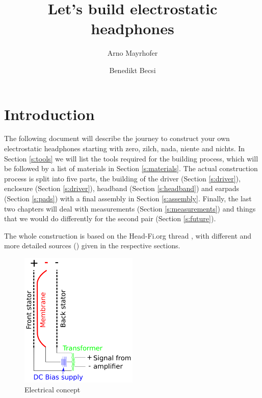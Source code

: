 \documentclass{article}
\begin{document}
\title{Let's build electrostatic headphones}
\author{Arno Mayrhofer \and Benedikt Becsi}
\maketitle

\tableofcontents

\newpage

\section{Introduction}
\label{s:intro}
The following document will describe the journey to construct your own electrostatic headphones starting with zero, zilch, nada, niente and nichts. In Section \ref{s:tools} we will list the tools required for the building process, which will be followed by a list of materials in Section \ref{s:materials}. The actual construction process is split into five parts, the building of the driver (Section \ref{s:driver}), enclosure (Section \ref{s:driver}), headband (Section \ref{s:headband}) and earpads (Section \ref{s:pads}) with a final assembly in Section \ref{s:assembly}. Finally, the last two chapters will deal with measurements (Section \ref{s:measurements}) and things that we would do differently for the second pair (Section \ref{s:future}).

The whole construction is based on the Head-Fi.org thread \cite{head-fi-diy-thread}, with different and more detailed sources (\cite{electrostatic-hp-design,tcengineering-electrostatic-drivers,ww_1979}) given in the respective sections.

\begin{figure}[htb]
    \centering
    \includegraphics[width=0.5\textwidth]{images/esl_animation.png}
    \caption{Electrical concept}
    \label{f:intro:e-concept}
\end{figure}
\end{document}
